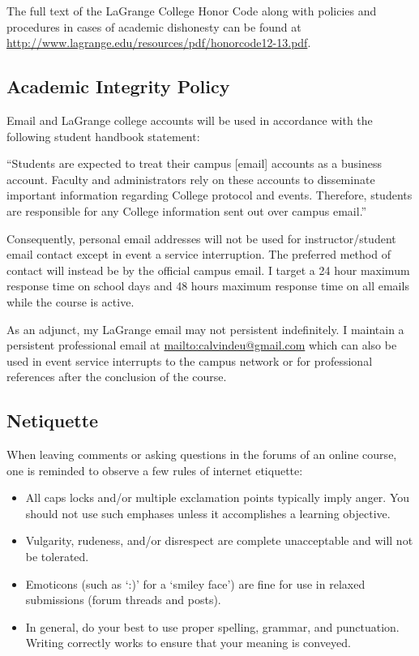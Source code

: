 \documentclass[11pt]{article}
\begin{document}
The full text of the LaGrange College Honor Code along with policies and procedures in cases of academic
dishonesty can be found at \url{http://www.lagrange.edu/resources/pdf/honorcode12-13.pdf}.

\subsection*{Academic Integrity Policy}

Email and LaGrange college accounts will be used in accordance with the following student handbook
statement:

\begin{displayquote}
“Students are expected to treat their campus [e­mail] accounts as a business account.
Faculty and administrators rely on these accounts to disseminate important information regarding
College protocol and events. Therefore, students are responsible for any College information sent
out over campus e­mail.”
\end{displayquote}

Consequently, personal email addresses will not be used for instructor/student email contact except in event a service interruption. The preferred
method of contact will instead be by the official campus email. I target a 24 hour maximum response time on school days and 48 hours maximum response time on all emails while the course is active.

As an adjunct, my LaGrange email may not persistent indefinitely. I maintain a persistent professional email at \href{calvindeu@gmail.com}{mailto:calvindeu@gmail.com} which can also be used in event service interrupts to the campus network or for professional references after the conclusion of the course.

\subsection*{Netiquette}

When leaving comments or asking questions in the forums of an online course, one is reminded to observe
a few rules of internet etiquette:

\begin{itemize}
\item All caps locks and/or multiple exclamation points typically imply anger. You should not use such
emphases unless it accomplishes a learning objective.
\item Vulgarity, rudeness, and/or disrespect are complete unacceptable and will not be tolerated.
\item Emoticons (such as ‘:)’ for a ‘smiley face’) are fine for use in relaxed submissions (forum threads
and posts).
\item In general, do your best to use proper spelling, grammar, and punctuation. Writing correctly
works to ensure that your meaning is conveyed.
\end{itemize}
\end{document}
